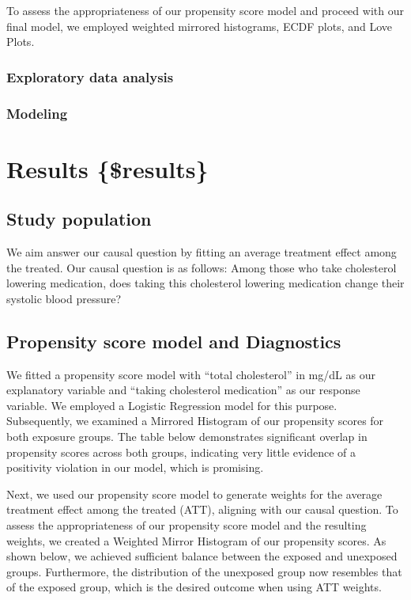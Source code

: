 \documentclass[useAMS,usenatbib,referee]{biom}
\begin{document}
To assess the appropriateness of our propensity score model and proceed
with our final model, we employed weighted mirrored histograms, ECDF
plots, and Love Plots.

\hypertarget{exploratory-data-analysis}{%
\subsubsection{Exploratory data
analysis}\label{exploratory-data-analysis}}

\hypertarget{modeling}{%
\subsubsection{Modeling}\label{modeling}}

\hypertarget{results-results}{%
\section{Results \{\$results\}}\label{results-results}}

\hypertarget{study-population}{%
\subsection{Study population}\label{study-population}}

We aim answer our causal question by fitting an average treatment effect
among the treated. Our causal question is as follows: Among those who
take cholesterol lowering medication, does taking this cholesterol
lowering medication change their systolic blood pressure?

\hypertarget{propensity-score-model-and-diagnostics}{%
\subsection{Propensity score model and
Diagnostics}\label{propensity-score-model-and-diagnostics}}

We fitted a propensity score model with ``total cholesterol'' in mg/dL
as our explanatory variable and ``taking cholesterol medication'' as our
response variable. We employed a Logistic Regression model for this
purpose. Subsequently, we examined a Mirrored Histogram of our
propensity scores for both exposure groups. The table below demonstrates
significant overlap in propensity scores across both groups, indicating
very little evidence of a positivity violation in our model, which is
promising.

Next, we used our propensity score model to generate weights for the
average treatment effect among the treated (ATT), aligning with our
causal question. To assess the appropriateness of our propensity score
model and the resulting weights, we created a Weighted Mirror Histogram
of our propensity scores. As shown below, we achieved sufficient balance
between the exposed and unexposed groups. Furthermore, the distribution
of the unexposed group now resembles that of the exposed group, which is
the desired outcome when using ATT weights.
\end{document}
